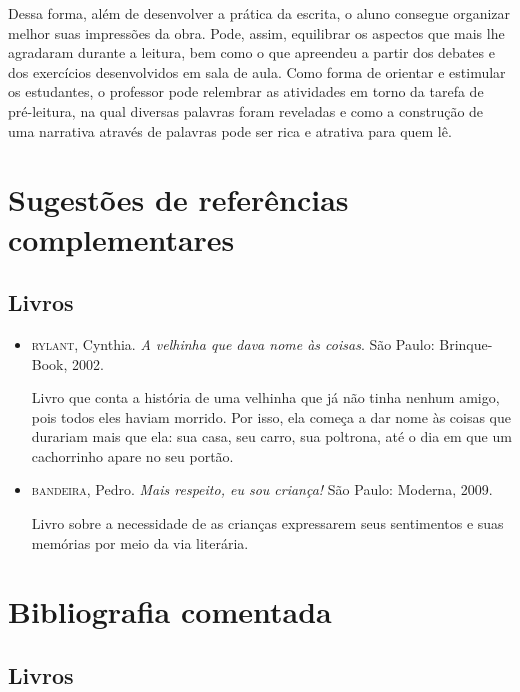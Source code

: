 \documentclass[11pt]{extarticle}
\begin{document}
Dessa forma, além de desenvolver a prática da escrita, o aluno consegue organizar melhor suas impressões da obra. Pode, assim, equilibrar os aspectos que mais lhe agradaram durante a leitura, bem como o que apreendeu a partir dos debates e dos exercícios desenvolvidos em sala de aula. Como forma de orientar e estimular os estudantes, o professor pode relembrar as atividades em torno da tarefa de pré-leitura, na qual diversas palavras foram reveladas e como a construção de uma narrativa através de palavras pode ser rica e atrativa para quem lê.

\section{Sugestões de referências complementares}

\subsection{Livros} 

\begin{itemize}
\item \textsc{rylant}, Cynthia. \textit{A velhinha que dava nome às coisas}. São Paulo: Brinque-Book, 2002.

Livro que conta a história de uma velhinha que já não tinha nenhum amigo, pois todos eles haviam morrido. Por isso, ela começa a dar nome às coisas que durariam mais que ela: sua casa, seu carro, sua poltrona, até o dia em que um cachorrinho apare no seu portão.

\item \textsc{bandeira}, Pedro. \textit{Mais respeito, eu sou criança!} São Paulo: Moderna, 2009.

Livro sobre a necessidade de as crianças expressarem seus sentimentos e suas memórias por meio da via literária.

\end{itemize}

\section{Bibliografia comentada}
\subsection{Livros}
\end{document}
